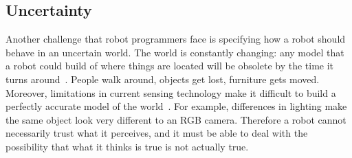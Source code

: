 \documentclass[10pt,twocolumn]{article}
\begin{document}



\subsection{Uncertainty}


Another challenge that robot programmers face is specifying how a robot should behave in an uncertain world. The world is constantly changing: any model that a robot could build of where things are located will be obsolete by the time it turns around~\cite{fox-jair99}. People walk around, objects get lost, furniture gets moved. Moreover, limitations in current sensing technology make it difficult to build a perfectly accurate model of the world~\cite{kemp-ieee07}. For example, differences in lighting make the same object look very different to an RGB camera. Therefore a robot cannot necessarily trust what it perceives, and it must be able to deal with the possibility that what it thinks is true is not actually true.
\end{document}
